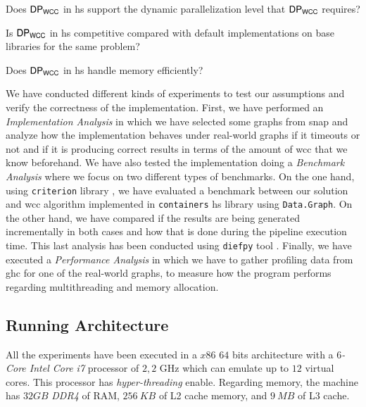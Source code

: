   \begin{inparaenum}[\bf {\bf RQ}1\upshape)]
  \label{res:question}
      \item Does $\mathsf{DP_{WCC}}$ in \acrshort{hs} support the dynamic parallelization level that $\mathsf{DP_{WCC}}$ requires?
      \item Is $\mathsf{DP_{WCC}}$ in \acrshort{hs} competitive compared with default implementations on base libraries for the same problem?
      \item Does $\mathsf{DP_{WCC}}$ in \acrshort{hs} handle memory efficiently?
  \end{inparaenum}
  
  We have conducted different kinds of experiments to test our assumptions and verify the correctness of the implementation.
  First, we have performed an \emph{Implementation Analysis} in which we have selected some graphs from \acrfull{snap} \cite{stanford} and analyze how the implementation behaves under real-world graphs if it timeouts or not and if it is producing correct results in terms of the amount of \acrshort{wcc} that we know beforehand.
  We have also tested the implementation doing a \emph{Benchmark Analysis} where we focus on two different types of benchmarks. On the one hand, using \texttt{criterion} library \cite{criterion}, we have evaluated a benchmark between our solution and \acrshort{wcc} algorithm implemented in \texttt{containers} \acrshort{hs} library \cite{containers} using \texttt{Data.Graph}. On the other hand, we have compared if the results are being generated incrementally in both cases and how that is done during the pipeline execution time. This last analysis has been conducted using \texttt{diefpy} tool \cite{diefpaper,diefpy}.
  Finally, we have executed a \textit{Performance Analysis} in which we have to gather profiling data from \acrfull{ghc} for one of the real-world graphs, to measure how the program performs regarding multithreading and memory allocation.
  
  \subsection{Running Architecture}
  All the experiments have been executed in a $x86$ $64$ bits architecture with a \textit{$6$-Core Intel Core i7} processor of $2,2$ GHz which can emulate up to $12$ virtual cores. This processor has \emph{hyper-threading} enable. Regarding memory, the machine has $32 GB$ \emph{DDR4} of RAM, $256\ KB$ of L2 cache memory, and $9\ MB$ of L3 cache.
  
